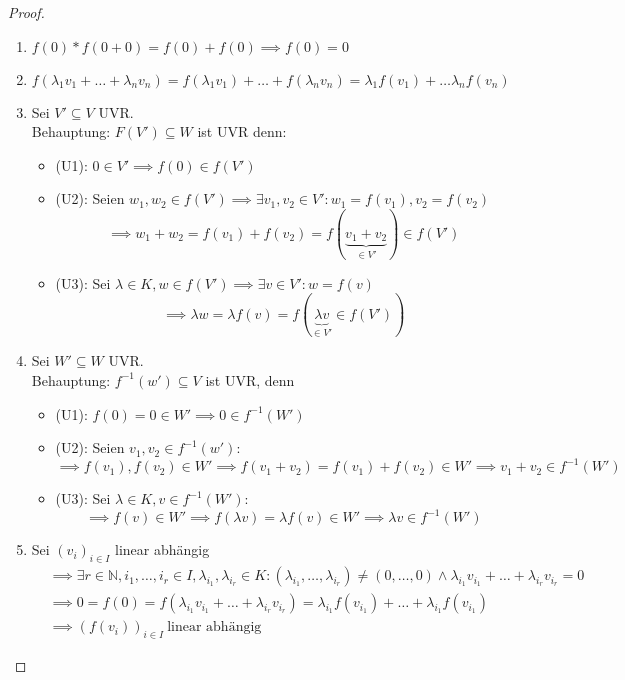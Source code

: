 \documentclass[a4paper]{scrartcl}
\DeclareMathOperator{\Exists}{\exists}
\theoremstyle{definition}
\theoremstyle{plain}
\theoremstyle{plain}
\theoremstyle{remark}
\theoremstyle{remark}
\theoremstyle{remark}
\theoremstyle{remark}
\theoremstyle{remark}
\begin{document}
\begin{proof}
\begin{enumerate}
\item $f(0) * f(0 + 0) = f(0) + f(0) \implies f(0) = 0$
\item $f(\lambda_1 v_1 + \ldots + \lambda_n v_n) = f(\lambda_1 v_1) + \ldots + f(\lambda_n v_n) = \lambda_1 f(v_1) + \ldots \lambda_n f(v_n)$
\item Sei $V' \subseteq V$ UVR. \\
         Behauptung: $F(V') \subseteq W$ ist UVR denn:
\begin{itemize}
\item (U1): $0 \in V' \implies f(0) \in f(V')$
\item (U2): Seien $w_1, w_2 \in f(V') \implies \Exists v_1, v_2 \in V': w_1 = f(v_1), v_2 = f(v_2)$
           \[\implies w_1 + w_2 = f(v_1) + f(v_2) = f(\underbrace{v_1 + v_2}_{\in V'}) \in f(V')\]
\item (U3): Sei $\lambda \in K, w\in f(V') \implies \Exists v\in V': w = f(v)$
           \[\implies \lambda w = \lambda f(v) = f(\underbrace{\lambda v}_{\in V'} \in f(V'))\]
\end{itemize}
\item Sei $W'\subseteq W$ UVR. \\
         Behauptung: $f^{-1}(w') \subseteq V$ ist UVR, denn
\begin{itemize}
\item (U1): $f(0) = 0 \in W' \implies 0 \in f^{-1}(W')$
\item (U2): Seien $v_1, v_2\in f^{-1}(w')$:
\[\implies f(v_1), f(v_2) \in W' \implies f(v_1 + v_2) = f(v_1) + f(v_2) \in W' \implies v_1 + v_2 \in f^{-1}(W')\]
\item (U3): Sei $\lambda \in K, v\in f^{-1}(W')$:
\[\implies f(v) \in W' \implies f(\lambda v) = \lambda f(v) \in W' \implies \lambda v \in f^{-1}(W')\]
\end{itemize}
\item Sei $(v_i)_{i\in I}$ linear abhängig
\begin{align*}
&\implies \Exists r\in \mathbb{N}, i_1, \ldots, i_r \in I, \lambda_{i_1}, \lambda_{i_r} \in K: (\lambda_{i_1}, \ldots, \lambda_{i_r}) \neq (0, \ldots, 0) \wedge \lambda_{i_1} v_{i_1} + \ldots + \lambda_{i_r} v_{i_r} = 0 \\
&\implies 0 = f(0) = f(\lambda_{i_1} v_{i_1} + \ldots + \lambda_{i_r} v_{i_r}) = \lambda_{i_1} f(v_{i_1}) + \ldots + \lambda_{i_1} f(v_{i_1}) \\
&\implies (f(v_i))_{i\in I} ~\text{linear abhängig}

\end{align*}
\end{enumerate}
\end{proof}
\end{document}
